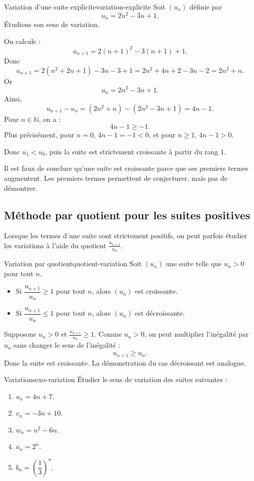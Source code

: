 \documentclass[11pt,a4paper]{article}
\newcommand{\N}{\mathbb{N}}
\begin{document}
\begin{examplebox}{Variation d'une suite explicite}{variation-explicite}
Soit $(u_n)$ définie par
\[
 u_n=2n^2-3n+1.
\]
Étudions son sens de variation.

On calcule :
\[
 u_{n+1}=2(n+1)^2-3(n+1)+1.
\]
Donc
\[
 u_{n+1}=2(n^2+2n+1)-3n-3+1=2n^2+4n+2-3n-2=2n^2+n.
\]
Or
\[
 u_n=2n^2-3n+1.
\]
Ainsi,
\[
 u_{n+1}-u_n=(2n^2+n)-(2n^2-3n+1)=4n-1.
\]
Pour $n\in\N$, on a :
\[
4n-1\geq -1.
\]
Plus précisément, pour $n=0$, $4n-1=-1<0$, et pour $n\geq1$, $4n-1>0$.

Donc $u_1<u_0$, puis la suite est strictement croissante à partir du rang $1$.
\end{examplebox}

\begin{warningbox}
Il est faux de conclure qu'une suite est croissante parce que ses premiers termes augmentent. Les premiers termes permettent de conjecturer, mais pas de démontrer.
\end{warningbox}

\subsection{Méthode par quotient pour les suites positives}

Lorsque les termes d'une suite sont strictement positifs, on peut parfois étudier les variations à l'aide du quotient $\frac{u_{n+1}}{u_n}$.

\begin{propositionbox}{Variation par quotient}{quotient-variation}
Soit $(u_n)$ une suite telle que $u_n>0$ pour tout $n$.
\begin{itemize}
  \item Si $\dfrac{u_{n+1}}{u_n}\geq1$ pour tout $n$, alors $(u_n)$ est croissante.
  \item Si $\dfrac{u_{n+1}}{u_n}\leq1$ pour tout $n$, alors $(u_n)$ est décroissante.
\end{itemize}
\end{propositionbox}

\begin{proofbox}
Supposons $u_n>0$ et $\frac{u_{n+1}}{u_n}\geq1$.
Comme $u_n>0$, on peut multiplier l'inégalité par $u_n$ sans changer le sens de l'inégalité :
\[
 u_{n+1}\geq u_n.
\]
Donc la suite est croissante. La démonstration du cas décroissant est analogue.
\end{proofbox}

\begin{exercisebox}{Variations}{exo-variation}
Étudier le sens de variation des suites suivantes :
\begin{enumerate}[label=\alph*)]
  \item $u_n=4n+7$.
  \item $v_n=-3n+10$.
  \item $w_n=n^2-6n$.
  \item $a_n=2^n$.
  \item $b_n=\left(\dfrac{1}{3}\right)^n$.
\end{enumerate}
\end{exercisebox}
\end{document}
